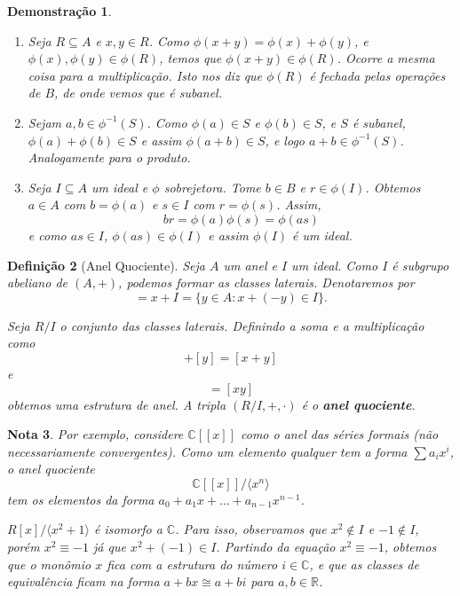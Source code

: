 \documentclass[11pt]{article}
\theoremstyle{plain}
\newtheorem{definicao}{Definição}[section]
\newtheorem{nota}[definicao]{Nota}
\theoremstyle{nonumberplain}
\newtheorem{demonstracao}[definicao]{Demonstração}
\newcommand{\R}{\mathbb{R}}
\newcommand{\C}{\mathbb{C}}
\newcommand{\inv}[1]{#1^{-1}}
\newcommand{\set}[1]{\{#1\}}
\newcommand{\braket}[1]{\langle #1 \rangle}
\newcommand{\sseq}{\subseteq}
\begin{document}
\begin{demonstracao}
    \begin{enumerate}
        \item Seja $R \sseq A$ e $x, y \in R$. Como $\phi(x + y) = \phi(x) + \phi(y)$, e $\phi(x), \phi(y) \in \phi(R)$, temos que $\phi(x + y) \in \phi(R)$. Ocorre a mesma coisa para a multiplicação. Isto nos diz que $\phi(R)$ é fechada pelas operações de $B$, de onde vemos que é subanel.
        \item Sejam $a, b \in \inv \phi (S)$. Como $\phi(a) \in S$ e $\phi(b) \in S$, e $S$ é subanel, $\phi(a) + \phi(b) \in S$ e assim $\phi(a + b) \in S$, e logo $a + b \in \inv \phi (S)$. Analogamente para o produto.
        \item Seja $I \sseq A$ um ideal e $\phi$ sobrejetora. Tome $b \in B$ e $r \in \phi(I)$. Obtemos $a \in A$ com $b = \phi(a)$ e $s \in I$ com $r = \phi(s)$. Assim, \begin{equation}
            br = \phi(a)\phi(s) = \phi(as)
        \end{equation}
        e como $as \in I$, $\phi(as) \in \phi(I)$ e assim $\phi(I)$ é um ideal.
    \end{enumerate}
\end{demonstracao}

\begin{definicao}[Anel Quociente]
    Seja $A$ um anel e $I$ um ideal. Como $I$ é subgrupo abeliano de $(A, +)$, podemos formar as classes laterais. Denotaremos por \begin{equation}
        [x] = x + I = \set {y \in A : x + (-y) \in I}.
    \end{equation}

    Seja $R/I$ o conjunto das classes laterais. Definindo a soma e a multiplicação como \begin{equation}
        [x] + [y] = [x + y]
    \end{equation}
    e \begin{equation}
        [x][y] = [xy]
    \end{equation}
    obtemos uma estrutura de anel. A tripla $(R/I, +, \cdot)$ é o \textbf{anel quociente}.
\end{definicao}

\begin{nota}
    Por exemplo, considere $\C[[x]]$ como o anel das séries formais (não necessariamente convergentes). Como um elemento qualquer tem a forma $\sum a_i x^i$, o anel quociente \begin{equation}
        \C[[x]]/\braket{x^n}
    \end{equation}
    tem os elementos da forma $a_0 + a_1x + ... + a_{n-1}x^{n-1}$.

    $R[x]/\braket{x^2 + 1}$ é isomorfo a $\C$. Para isso, observamos que $x^2 \notin I$ e $-1 \notin I$, porém $x^2 \equiv -1$ já que $x^2 + (-1) \in I$. Partindo da equação $x^2 \equiv -1$, obtemos que o monômio $x$ fica com a estrutura do número $i \in \C$, e que as classes de equivalência ficam na forma $a + bx \cong a + bi$ para $a, b \in \R$.
\end{nota}
\end{document}
